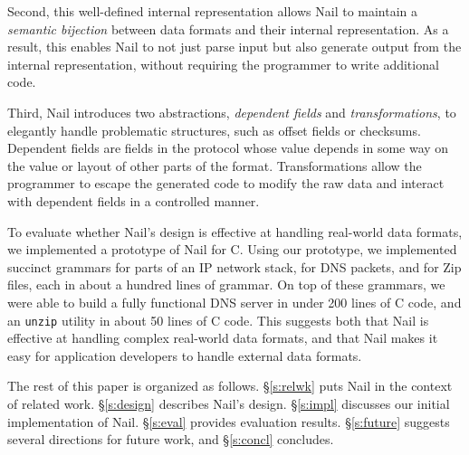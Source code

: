 Second, this well-defined internal representation allows Nail to
maintain a {\em semantic bijection} between data formats and their
internal representation.  As a result, this enables Nail to not just
parse input but also generate output from the internal representation,
without requiring the programmer to write additional code.




Third, Nail introduces two abstractions, \emph{dependent fields} and \emph{transformations}, to
elegantly handle problematic structures, such as offset fields or checksums. Dependent fields are
fields in the protocol whose value depends in some way on the value or layout of other parts of the
format. Transformations allow the programmer to escape the generated code to modify the raw data and
interact with dependent fields in a controlled manner. 

To evaluate whether Nail's design is effective at handling real-world
data formats, we implemented a prototype of Nail for C\@.  Using our
prototype, we implemented succinct grammars for parts of an IP network
stack, for DNS packets, and for Zip files, each in about a hundred lines
of grammar.  On top of these grammars, we were able to build a fully
functional DNS server in under 200 lines of C code, and an {\tt unzip}
utility in about 50 lines of C code.  This suggests both that Nail is
effective at handling complex real-world data formats, and that Nail
makes it easy for application developers to handle external data formats.

The rest of this paper is organized as follows.  \S\ref{s:relwk}
puts Nail in the context of related work.  \S\ref{s:design} describes
Nail's design.  \S\ref{s:impl} discusses our initial implementation
of Nail.  \S\ref{s:eval} provides evaluation results.
\S\ref{s:future} suggests several directions for future work, and
\S\ref{s:concl} concludes.

